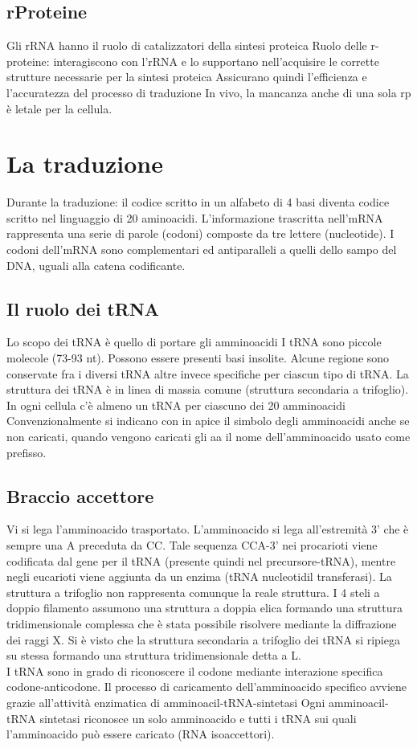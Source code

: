 \documentclass{article}
\begin{document}
\subsection{rProteine}
Gli rRNA hanno il ruolo di catalizzatori della sintesi proteica
Ruolo delle r-proteine: interagiscono con l'rRNA e lo
supportano nell'acquisire le corrette strutture
necessarie per la sintesi proteica
Assicurano quindi l'efficienza e l'accuratezza del
processo di traduzione
In vivo, la mancanza anche di una sola rp è letale per la cellula.
\section{La traduzione}
Durante la traduzione: il codice scritto in un alfabeto di 4 basi diventa codice scritto nel linguaggio di 20 aminoacidi.
L'informazione trascritta nell'mRNA rappresenta una serie di parole (codoni) composte da tre lettere (nucleotide). I codoni dell'mRNA sono complementari ed antiparalleli a quelli dello sampo del DNA, uguali alla catena codificante.
\subsection{Il ruolo dei tRNA}
Lo scopo dei tRNA è quello di portare gli amminoacidi
I tRNA sono piccole molecole (73-93 nt). Possono essere presenti basi insolite.
Alcune regione sono conservate fra i diversi tRNA altre invece specifiche per ciascun tipo di tRNA. La struttura dei tRNA è in linea di massia comune (struttura secondaria a trifoglio).\\
In ogni cellula c'è almeno un tRNA per ciascuno dei 20 amminoacidi
Convenzionalmente si indicano con in apice il simbolo degli amminoacidi anche se non
caricati, quando vengono caricati gli aa il nome dell'amminoacido usato come prefisso.
\subsection{Braccio accettore}
Vi si lega l'amminoacido trasportato. L'amminoacido si lega all'estremità 3' che è sempre una A preceduta da CC.
Tale sequenza CCA-3' nei procarioti viene codificata dal gene per il tRNA (presente quindi nel precursore-tRNA),
mentre negli eucarioti viene aggiunta da un enzima (tRNA nucleotidil transferasi).
La struttura a trifoglio non rappresenta comunque la reale struttura. I 4 steli a
doppio filamento assumono una struttura a doppia elica formando una
struttura tridimensionale complessa che è stata possibile risolvere mediante
la diffrazione dei raggi X. Si è visto che la struttura secondaria a trifoglio dei
tRNA si ripiega su stessa formando una struttura
tridimensionale detta a L.\\
I tRNA sono in grado di riconoscere il codone mediante interazione
specifica codone-anticodone. Il processo di caricamento dell'amminoacido specifico avviene grazie
all'attività enzimatica di amminoacil-tRNA-sintetasi
Ogni amminoacil-tRNA sintetasi riconosce un solo amminoacido e tutti i
tRNA sui quali l'amminoacido può essere caricato (RNA isoaccettori).
\end{document}
